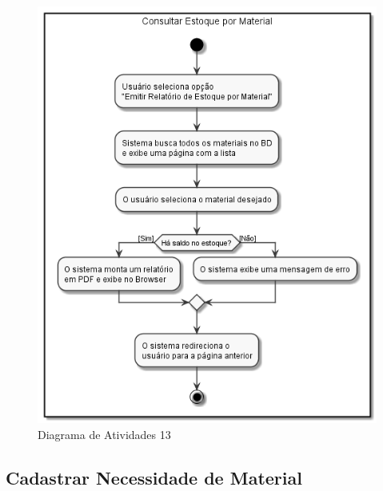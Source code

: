 \documentclass[rascunho,xindy,acronym,symbols]{fei}
\begin{document}
\begin{figure}[H]
    \centering
    \includegraphics[scale=0.6, width=400pt]{./Images/Consultar_Estoque_por_Material.png}
    \caption{Diagrama de Atividades 13}
    \label{fig:diag_atv13}
\end{figure}

\subsection{Cadastrar Necessidade de Material}
\end{document}
